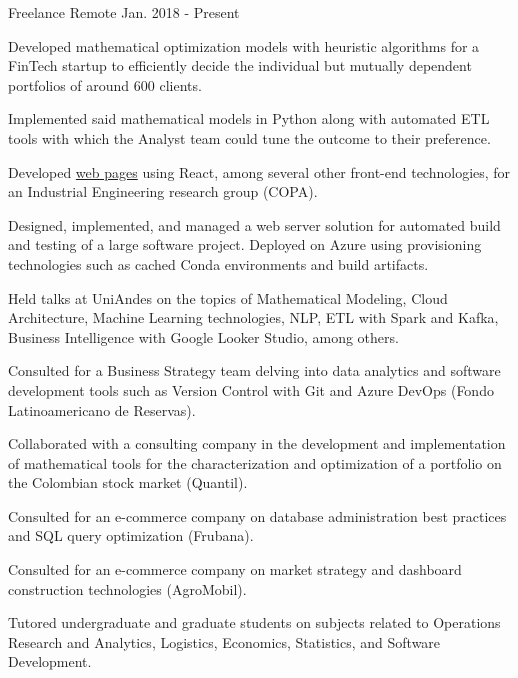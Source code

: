 

\begin{cventries}

	{Freelance} %
	{Remote} %
	{Jan. 2018 {-} Present} %
	{
		\begin{cvitems} %
			\item {Developed mathematical optimization models with heuristic algorithms for a FinTech startup to efficiently decide the individual but mutually dependent portfolios of around 600 clients.}
			\item {Implemented said mathematical models in Python along with automated ETL tools with which the Analyst team could tune the outcome to their preference.}
			\item {Developed \href{https://copa.uniandes.edu.co/en/}{web pages} using React, among several other front-end technologies, for an Industrial Engineering research group (COPA).}
			\item {Designed, implemented, and managed a web server solution for automated build and testing of a large software project. Deployed on Azure using provisioning technologies such as cached Conda environments and build artifacts.}
			\item {Held talks at UniAndes on the topics of Mathematical Modeling, Cloud Architecture, Machine Learning technologies, NLP, ETL with Spark and Kafka, Business Intelligence with Google Looker Studio, among others.}
			\item {Consulted for a Business Strategy team delving into data analytics and software development tools such as Version Control with Git and Azure DevOps (Fondo Latinoamericano de Reservas).}
			\item {Collaborated with a consulting company in the development and implementation of mathematical tools for the characterization and optimization of a portfolio on the Colombian stock market (Quantil).}
			\item {Consulted for an e-commerce company on database administration best practices and SQL query optimization (Frubana).}
			\item {Consulted for an e-commerce company on market strategy and dashboard construction technologies (AgroMobil).}
			\item {Tutored undergraduate and graduate students on subjects related to Operations Research and Analytics, Logistics, Economics, Statistics, and Software Development.}
		\end{cvitems}
	}


\end{cventries}
